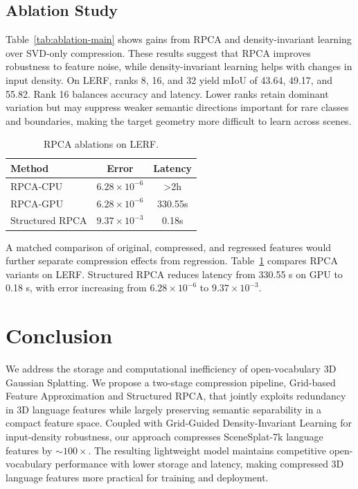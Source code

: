 \documentclass[10pt,twocolumn,letterpaper]{article}
\begin{document}
\subsection{Ablation Study}
Table~\ref{tab:ablation-main} shows gains from RPCA and density-invariant learning over SVD-only compression. These results suggest that RPCA improves robustness to feature noise, while density-invariant learning helps with changes in input density. On LERF, ranks 8, 16, and 32 yield mIoU of 43.64, 49.17, and 55.82. Rank 16 balances accuracy and latency. Lower ranks retain dominant variation but may suppress weaker semantic directions important for rare classes and boundaries, making the target geometry more difficult to learn across scenes.
\begin{table}[t]
  \centering
  \caption{RPCA ablations on LERF.}
  \label{tab:ablation_latency}
  \begin{tabular}{@{}l|cc@{}}
    \toprule
    Method & Error & Latency \\
    \midrule
    RPCA-CPU & $6.28 \times 10^{-6}$ & >2h \\
    RPCA-GPU & $6.28 \times 10^{-6}$ & 330.55s \\
    Structured RPCA & $9.37 \times 10^{-3}$ & 0.18s \\
    \bottomrule
  \end{tabular}
\end{table}
A matched comparison of original, compressed, and regressed features would further separate compression effects from regression. Table~\ref{tab:ablation_latency} compares RPCA variants on LERF. Structured RPCA reduces latency from 330.55 s on GPU to 0.18 s, with error increasing from $6.28\times10^{-6}$ to $9.37\times10^{-3}$.

\section{Conclusion}
We address the storage and computational inefficiency of open-vocabulary 3D Gaussian Splatting. We propose a two-stage compression pipeline, Grid-based Feature Approximation and Structured RPCA, that jointly exploits redundancy in 3D language features while largely preserving semantic separability in a compact feature space. Coupled with Grid-Guided Density-Invariant Learning for input-density robustness, our approach compresses SceneSplat-7k language features by $\sim100\times$. The resulting lightweight model maintains competitive open-vocabulary performance with lower storage and latency, making compressed 3D language features more practical for training and deployment.
\end{document}
